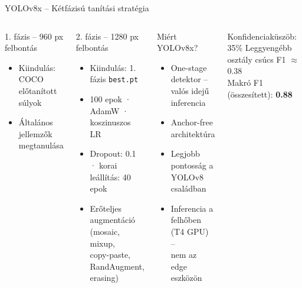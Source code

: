 \documentclass[aspectratio=169]{beamer}
\begin{document}
\begin{frame}{YOLOv8x – Kétfázisú tanítási stratégia}
  \begin{columns}[T]
      \begin{block}{1. fázis – 960 px felbontás}
        \begin{itemize}
          \item Kiindulás: COCO előtanított súlyok
          \item Általános jellemzők megtanulása
        \end{itemize}
      \end{block}
      \vspace{0.4em}
      \begin{block}{2. fázis – 1280 px felbontás}
        \begin{itemize}
          \item Kiindulás: 1. fázis \texttt{best.pt}
          \item 100 epok · AdamW · koszinuszos LR
          \item Dropout: 0.1 · korai leállítás: 40 epok
          \item Erőteljes augmentáció (mosaic, mixup,\\copy-paste, RandAugment, erasing)
        \end{itemize}
      \end{block}
      \begin{alertblock}{Miért YOLOv8x?}
        \begin{itemize}
          \setlength\itemsep{0.3em}
          \item One-stage detektor – valós idejű inferencia
          \item Anchor-free architektúra
          \item Legjobb pontosság a YOLOv8 családban
          \item Inferencia a felhőben (T4 GPU) –\\nem az edge eszközön
        \end{itemize}
      \end{alertblock}
      \vspace{0.4em}
      \begin{exampleblock}{Konfidenciaküszöb: 35\%}
        \centering
        Leggyengébb osztály csúcs F1 $\approx$ 0.38\\
        Makró F1 (összesített): \textbf{0.88}
      \end{exampleblock}
    \end{columns}
\end{frame}
\end{document}
